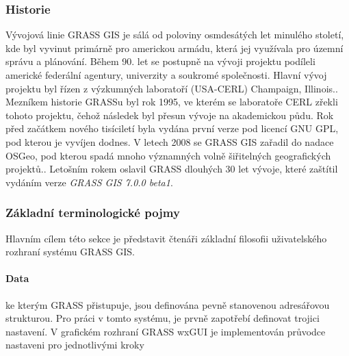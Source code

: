 \documentclass[a4paper,12pt]{article}
\begin{document}
\subsubsection*{Historie}
Vývojová linie GRASS GIS je sálá od poloviny osmdesátých let minulého století, kde byl vyvinut primárně pro americkou armádu, která jej využívala pro územní správu a plánování. Během 90. let se postupně na vývoji projektu podíleli americké federální agentury, univerzity a soukromé společnosti. Hlavní vývoj projektu byl řízen z výzkumných laboratoří (USA-CERL) Champaign, Illinois.\cite{grasshist}.
Mezníkem historie GRASSu byl rok 1995, ve kterém se laboratoře CERL zřekli tohoto projektu, čehož  následek byl přesun vývoje na akademickou půdu. Rok před začátkem nového tisíciletí byla vydána první verze pod licencí GNU GPL, pod kterou je vyvíjen dodnes. V letech 2008 se GRASS GIS zařadil do nadace \acs{OSGeo}, pod kterou spadá mnoho významných volně šiřitelných geografických projektů.. Letošním rokem oslavil GRASS dlouhých 30 let vývoje, které zaštítil vydáním verze \textit{GRASS GIS 7.0.0 beta1}.

\subsubsection*{Základní terminologické pojmy}
Hlavním cílem této sekce je představit čtenáři základní filosofii uživatelského rozhraní systému GRASS GIS.
\paragraph*{Data} ke kterým GRASS přistupuje, jsou definována  pevně stanovenou  adresářovou  strukturou. Pro práci v tomto systému, je prvně zapotřebí definovat trojici nastavení. V grafickém rozhraní GRASS \acs{wxGUI} je implementován průvodce nastaveni pro jednotlivými kroky 
\end{document}
